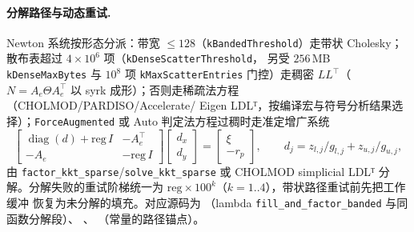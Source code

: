 \paragraph{分解路径与动态重试.}
Newton 系统按形态分派：带宽 $\le 128$（\texttt{kBandedThreshold}）走带状
Cholesky；散布表超过 $4\times 10^{6}$ 项（\texttt{kDenseScatterThreshold}，
另受 $256\,$MB \texttt{kDenseMaxBytes} 与 $10^{8}$ 项
\texttt{kMaxScatterEntries} 门控）走稠密 $LL^{\top}$（$N = A_e \Theta
A_e^{\top}$ 以 syrk 成形）；否则走稀疏法方程（CHOLMOD/PARDISO/Accelerate/
Eigen LDLᵀ，按编译宏与符号分析结果选择）；\texttt{ForceAugmented} 或
Auto 判定法方程过稠时走准定增广系统
\begin{equation}
  \begin{bmatrix} \operatorname{diag}(d) + \mathrm{reg}\, I & -A_e^{\top}\\
  -A_e & -\mathrm{reg}\, I \end{bmatrix}
  \begin{bmatrix} d_x \\ d_y \end{bmatrix} =
  \begin{bmatrix} \xi \\ -r_p \end{bmatrix},
  \qquad d_j = z_{l,j}/g_{l,j} + z_{u,j}/g_{u,j},
  \label{eq:ipmlp:augmented}
\end{equation}
由 \texttt{factor\_kkt\_sparse}/\texttt{solve\_kkt\_sparse} 或 CHOLMOD
simplicial LDLᵀ 分解。分解失败的重试阶梯统一为
$\mathrm{reg} \times 100^{k}$（$k = 1..4$），带状路径重试前先把工作缓冲
恢复为未分解的填充。对应源码为
（lambda \texttt{fill\_and\_factor\_banded} 与同函数分解段）、
、
（常量的路径锚点）。

